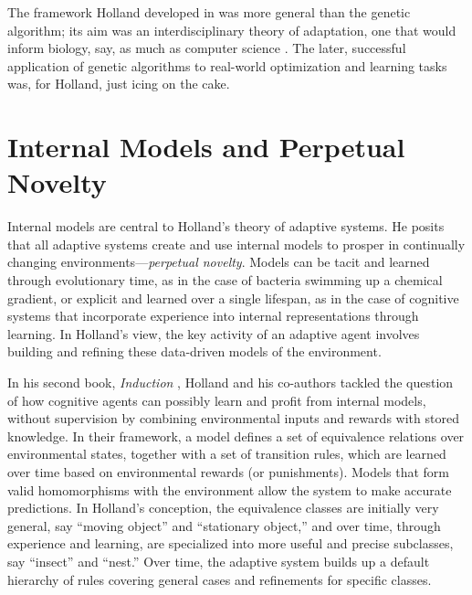 \documentclass{sig-alternate}
\begin{document}
The framework Holland developed in \cite{Holland1975} was more general
than the genetic algorithm; its aim was an interdisciplinary theory of
adaptation, one that would inform biology, say, as much as computer
science \cite{Christiansen1998}.  The later, successful application of
genetic algorithms to real-world optimization and learning tasks was,
for Holland, just icing on the cake.

\section{Internal Models and Perpetual Novelty}


Internal models are central to Holland's theory of adaptive
systems.  He posits that all adaptive systems create and use internal
models to prosper in continually
changing environments---\emph{perpetual novelty}. Models can be tacit and learned
  through evolutionary time, as in the case of bacteria swimming up a
  chemical gradient, or explicit and learned over a single lifespan,
  as in the case of cognitive systems that incorporate experience into
  internal representations through learning.  In
  Holland's view, the key activity of an adaptive agent involves
  building and refining these data-driven models
  of the environment.

In his second book, \emph{Induction} \cite{Holland1989}, Holland and
his co-authors tackled the question of how cognitive agents can
possibly learn and profit from
internal models, without supervision by combining
environmental inputs and rewards with stored knowledge.   In their
framework, a 
model defines a set of equivalence relations over environmental states,
together with a set of transition rules, which are learned over time
based on environmental rewards (or punishments).  Models that
form valid homomorphisms with the environment allow the system to make
accurate predictions.  In Holland's conception, the equivalence
classes are initially very general, say ``moving object'' and
``stationary object,'' and over time, through experience and learning,
 are specialized into more useful and precise subclasses, say
``insect'' and ``nest.''   Over time, the adaptive system
builds up a default hierarchy of rules covering general
cases and refinements for specific classes.  
\end{document}

